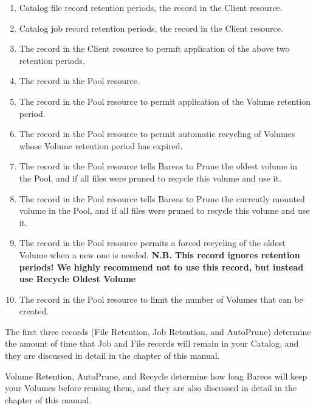 \begin{enumerate}
\item Catalog file record retention periods, the
     record in the Client
   resource.
\item Catalog job record retention periods, the
     record in the Client
   resource.
\item The
    record in the Client resource
   to permit  application of the above two retention periods.
\item The
    record in the Pool
   resource.
\item The
    record in the Pool
   resource to permit  application of the Volume retention period.
\item The
    record in the Pool resource
   to permit  automatic recycling of Volumes whose Volume retention period has
   expired.
\item The
    record in the
   Pool resource tells Bareos  to Prune the oldest volume in the Pool, and if all
   files  were pruned to recycle this volume and use it.
\item The
    record in
   the Pool resource tells Bareos  to Prune the currently mounted volume in the
   Pool, and if all files  were pruned to recycle this volume and use it.
\item The
    record in the
   Pool resource  permits a forced recycling of the oldest Volume when a new one
   is  needed.  {\bf N.B. This record ignores retention periods! We highly
   recommend  not to use this record, but instead use Recycle Oldest Volume}
\item The
    record in the Pool
   resource to limit  the number of Volumes that can be created.
\end{enumerate}

The first three records (File Retention, Job Retention, and AutoPrune)
determine the amount of time that Job and File records will remain in your
Catalog, and they are discussed in detail in the
 chapter of
this manual.

Volume Retention, AutoPrune, and Recycle determine how long Bareos will keep
your Volumes before reusing them, and they are also discussed in detail in the
 chapter of
this manual.

